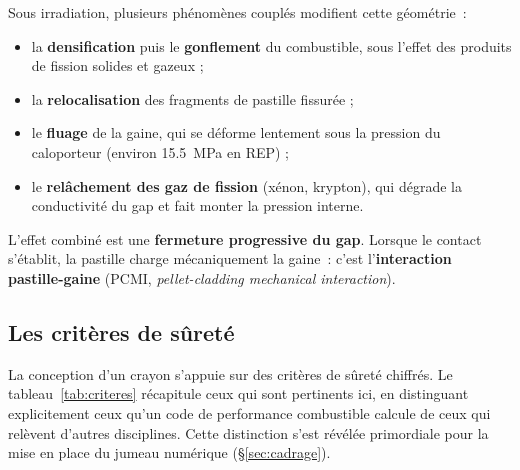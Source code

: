 \documentclass[12pt,a4paper,french]{report}
\begin{document}
Sous irradiation, plusieurs phénomènes couplés modifient cette géométrie~:
\begin{itemize}
  \item la \textbf{densification} puis le \textbf{gonflement} du combustible,
    sous l'effet des produits de fission solides et gazeux ;
  \item la \textbf{relocalisation} des fragments de pastille fissurée ;
  \item le \textbf{fluage} de la gaine, qui se déforme lentement sous la
    pression du caloporteur (environ \SI{15.5}{\mega\pascal} en REP) ;
  \item le \textbf{relâchement des gaz de fission} (xénon, krypton), qui
    dégrade la conductivité du gap et fait monter la pression interne.
\end{itemize}

L'effet combiné est une \textbf{fermeture progressive du gap}. Lorsque le
contact s'établit, la pastille charge mécaniquement la gaine~: c'est
l'\textbf{interaction pastille-gaine} (PCMI, \textit{pellet-cladding mechanical
interaction}).

\subsection{Les critères de sûreté}

La conception d'un crayon s'appuie sur des critères de sûreté chiffrés. Le
tableau~\ref{tab:criteres} récapitule ceux qui sont pertinents ici, en
distinguant explicitement ceux qu'un code de performance combustible calcule de
ceux qui relèvent d'autres disciplines. Cette distinction s'est révélée
primordiale pour la mise en place du jumeau numérique (§\ref{sec:cadrage}).
\end{document}
